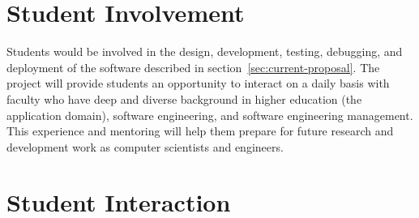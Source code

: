 \documentclass{article}
\begin{document}
\section{Student Involvement}
\label{sec:student-involvement}



Students would be involved in the design, development, testing, debugging, and deployment
of the software described in section~\ref{sec:current-proposal}.
The project will provide students an opportunity to interact
on a daily basis
with faculty who have deep and diverse background in
higher education (the application domain),
software engineering,
and software engineering management.
This experience and mentoring
will help them prepare for future
research and development work
as computer scientists and engineers.

\section{Student Interaction}
\label{sec:student-interaction}




\end{document}
